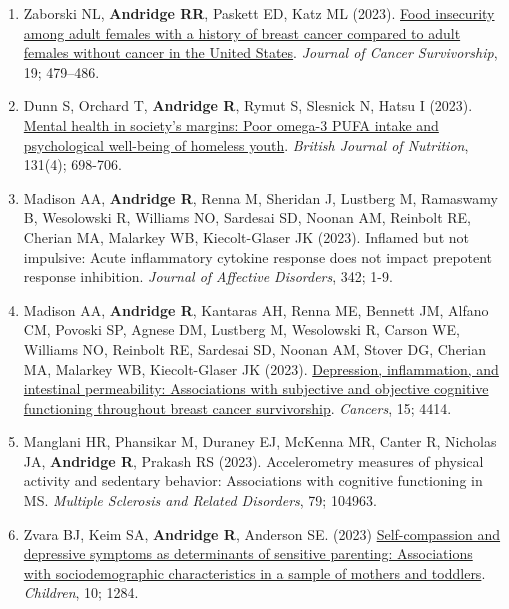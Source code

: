 \documentclass[
  english,
  letterpaper,
  DIV=11,
  numbers=noendperiod]{scrartcl}
\begin{document}
\begin{enumerate}
  Whitmoyer P, Fisher ME, Duraney EJ, Manzler C, Isaacowitz I,
  \textbf{Andridge R}, Prakash RS (2024). Age differences in emotion
  regulation strategy use and flexibility in daily life. \emph{Aging \&
  Mental Health}, 28(2), 330-343.
\item
  Zaborski NL, \textbf{Andridge RR}, Paskett ED, Katz ML (2023).
  \href{https://doi.org/10.1007/s11764-023-01481-3}{Food insecurity
  among adult females with a history of breast cancer compared to adult
  females without cancer in the United States}. \emph{Journal of Cancer
  Survivorship}, 19; 479--486.
\item
  Dunn S, Orchard T, \textbf{Andridge R}, Rymut S, Slesnick N, Hatsu I
  (2023). \href{https://doi.org/10.1017/S000711452300212X}{Mental health
  in society's margins: Poor omega-3 PUFA intake and psychological
  well-being of homeless youth}. \emph{British Journal of Nutrition},
  131(4); 698-706.
\item
  Madison AA, \textbf{Andridge R}, Renna M, Sheridan J, Lustberg M,
  Ramaswamy B, Wesolowski R, Williams NO, Sardesai SD, Noonan AM,
  Reinbolt RE, Cherian MA, Malarkey WB, Kiecolt-Glaser JK (2023).
  Inflamed but not impulsive: Acute inflammatory cytokine response does
  not impact prepotent response inhibition. \emph{Journal of Affective
  Disorders}, 342; 1-9.
\item
  Madison AA, \textbf{Andridge R}, Kantaras AH, Renna ME, Bennett JM,
  Alfano CM, Povoski SP, Agnese DM, Lustberg M, Wesolowski R, Carson WE,
  Williams NO, Reinbolt RE, Sardesai SD, Noonan AM, Stover DG, Cherian
  MA, Malarkey WB, Kiecolt-Glaser JK (2023).
  \href{https://doi.org/10.3390/cancers15174414}{Depression,
  inflammation, and intestinal permeability: Associations with
  subjective and objective cognitive functioning throughout breast
  cancer survivorship}. \emph{Cancers}, 15; 4414.
\item
  Manglani HR, Phansikar M, Duraney EJ, McKenna MR, Canter R, Nicholas
  JA, \textbf{Andridge R}, Prakash RS (2023). Accelerometry measures of
  physical activity and sedentary behavior: Associations with cognitive
  functioning in MS. \emph{Multiple Sclerosis and Related Disorders},
  79; 104963.
\item
  Zvara BJ, Keim SA, \textbf{Andridge R}, Anderson SE. (2023)
  \href{https://doi.org/10.3390/children10081284}{Self-compassion and
  depressive symptoms as determinants of sensitive parenting:
  Associations with sociodemographic characteristics in a sample of
  mothers and toddlers}. \emph{Children}, 10; 1284.

\end{enumerate}
\end{document}
